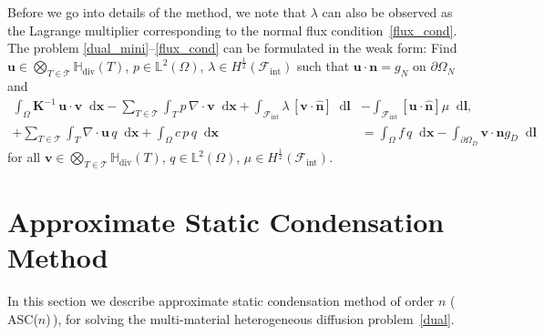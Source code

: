 \documentclass[12pt]{article}
\newcommand*\widefbox[1]{\fbox{\hspace{1em}#1\hspace{1em}}}
\newcommand{\vect}[1]{\boldsymbol{\mathbf{#1}}}
\newcommand{\bcell}{T}
\newcommand{\bmesh}{{\vect{\mathcal T}}}
\newcommand{\bfaces}[1][]{{\vect{\mathcal F}_{\text{#1}}}}
\newcommand{\LTwoSpace}[1][\Omega]{{\mathbb L^2\left({#1}\right)}}
\newcommand{\HDivSpace}[1][\Omega]{{\mathbb H_\text{div}\left({#1}\right)}}
\newcommand*\diff{\mathop{}\!\mathrm{d}}
\begin{document}
Before we go into details of the method, we note that $\lambda$ can also  be observed as the Lagrange multiplier corresponding to the normal flux condition~\eqref{flux_cond}. The problem \eqref{dual_mini}--\eqref{flux_cond} can be formulated in the weak form: Find  $\vect u  \in \bigotimes\limits_{\bcell\in\bmesh}\HDivSpace[\bcell]$, $ p\in\LTwoSpace[\Omega]$, $\lambda\in H^{\frac12}(\bfaces[int])$ such that $\vect u\cdot{\vect n}=g_N$ on $\partial\Omega_N$ and
\begin{equation}\label{weak_form}
		\begin{split}
				\int_{\Omega} \vect K^{-1}\,\vect u\cdot\vect v \diff \vect x - \sum_{\bcell\in\bmesh}\int_\bcell p\,\nabla\cdot\vect v \diff \vect x +\int_{\bfaces[int]} \lambda\,\left[\vect v\cdot\hat{\vect n}\right] \diff \vect l &- \int_{\bfaces[int]}\left[\vect u\cdot\hat{\vect n}\right]\mu\diff \vect l, \\
				+\sum_{\bcell\in\bmesh}\int_\bcell \nabla\cdot\vect u\,q \diff \vect x + \int_\Omega c\,p\,q \diff \vect x &= \int_\Omega f\,q \diff \vect x-\int_{\partial\Omega_D}\vect v\cdot{\vect n}g_D\diff \vect l
		\end{split}
	\end{equation}
for all $\vect v  \in \bigotimes\limits_{\bcell\in\bmesh}\HDivSpace[\bcell]$, $ q\in\LTwoSpace[\Omega]$, $\mu\in H^{\frac12}(\bfaces[int])$.



	\section{Approximate Static Condensation Method} \label{sec:ASC}
	
	In this section we describe  approximate static condensation method of order $n$ ( ASC($n$)\,), for solving the multi-material heterogeneous diffusion problem~\eqref{dual}.
	
\end{document}
